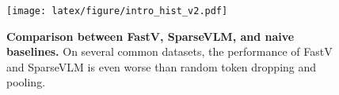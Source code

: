 \begin{figure}[!t]
    \centering
    \texttt{[image: latex/figure/intro\_hist\_v2.pdf]}
    \vspace{-0.7cm}
    \caption{\textbf{Comparison between FastV, SparseVLM, and naive baselines.} On several common datasets, the performance of FastV and SparseVLM is even worse than random token dropping and pooling.}
    \vspace{-0.7cm}
    \label{fig:intro_hist}
\end{figure}